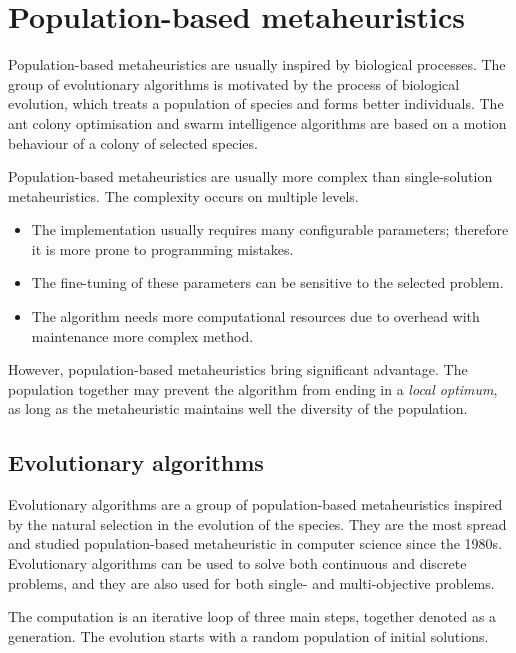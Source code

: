 \documentclass[
    digital,    %
    oneside,    %
    color,
    11pt,
    nocover,
    notable,
    nolof,
    nolot,
]{fithesis3}
\begin{document}
\section{Population-based metaheuristics}
\label{sec:opt-population}

Population-based metaheuristics are usually inspired by biological processes. The group of evolutionary algorithms is motivated by the process of biological evolution, which treats a population of species and forms better individuals. The ant colony optimisation and swarm intelligence algorithms are based on a motion behaviour of a colony of selected species.

Population-based metaheuristics are usually more complex than single-solu\-tion metaheuristics. The complexity occurs on multiple levels.

\begin{itemize}
    \item The implementation usually requires many configurable parameters; therefore it is more prone to programming mistakes.
    \item The fine-tuning of these parameters can be sensitive to the selected problem.
    \item The algorithm needs more computational resources due to overhead with maintenance more complex method.
\end{itemize}

However, population-based metaheuristics bring significant advantage. The population together may prevent the algorithm from ending in a \textit{local optimum}, as long as the metaheuristic maintains well the diversity of the population.

\subsection{Evolutionary algorithms}
\label{subsec:opt-popul-ea}

Evolutionary algorithms are a group of population-based metaheuristics inspired by the natural selection in the evolution of the species. They are the most spread and studied population-based metaheuristic in computer science since the 1980s. Evolutionary algorithms can be used to solve both continuous and discrete problems, and they are also used for both single- and multi-objective problems.

The computation is an iterative loop of three main steps, together denoted as a generation. The evolution starts with a random population of initial solutions.
\end{document}
